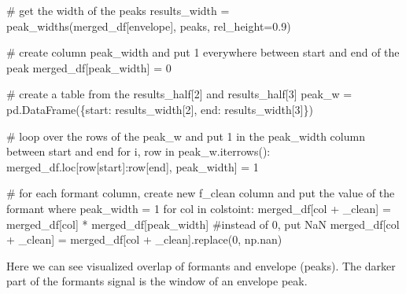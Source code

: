 \documentclass[
  letterpaper,
  DIV=11,
  numbers=noendperiod]{scrreprt}
\newenvironment{Shaded}{\begin{snugshade}}{\end{snugshade}}
\newcommand{\CommentTok}[1]{\textcolor[rgb]{0.37,0.37,0.37}{#1}}
\newcommand{\ControlFlowTok}[1]{\textcolor[rgb]{0.00,0.23,0.31}{#1}}
\newcommand{\DecValTok}[1]{\textcolor[rgb]{0.68,0.00,0.00}{#1}}
\newcommand{\FloatTok}[1]{\textcolor[rgb]{0.68,0.00,0.00}{#1}}
\newcommand{\KeywordTok}[1]{\textcolor[rgb]{0.00,0.23,0.31}{#1}}
\newcommand{\NormalTok}[1]{\textcolor[rgb]{0.00,0.23,0.31}{#1}}
\newcommand{\OperatorTok}[1]{\textcolor[rgb]{0.37,0.37,0.37}{#1}}
\newcommand{\StringTok}[1]{\textcolor[rgb]{0.13,0.47,0.30}{#1}}
\begin{document}
\begin{Shaded}
\begin{Highlighting}[]
\CommentTok{\# get the width of the peaks}
\NormalTok{results\_width }\OperatorTok{=}\NormalTok{ peak\_widths(merged\_df[}\StringTok{\textquotesingle{}envelope\textquotesingle{}}\NormalTok{], peaks, rel\_height}\OperatorTok{=}\FloatTok{0.9}\NormalTok{)}

\CommentTok{\# create column peak\_width and put 1 everywhere between start and end of the peak}
\NormalTok{merged\_df[}\StringTok{\textquotesingle{}peak\_width\textquotesingle{}}\NormalTok{] }\OperatorTok{=} \DecValTok{0}

\CommentTok{\# create a table from the results\_half[2] and results\_half[3]}
\NormalTok{peak\_w }\OperatorTok{=}\NormalTok{ pd.DataFrame(\{}\StringTok{\textquotesingle{}start\textquotesingle{}}\NormalTok{: results\_width[}\DecValTok{2}\NormalTok{], }\StringTok{\textquotesingle{}end\textquotesingle{}}\NormalTok{: results\_width[}\DecValTok{3}\NormalTok{]\})}

\CommentTok{\# loop over the rows of the peak\_w and put 1 in the peak\_width column between start and end}
\ControlFlowTok{for}\NormalTok{ i, row }\KeywordTok{in}\NormalTok{ peak\_w.iterrows():}
\NormalTok{    merged\_df.loc[row[}\StringTok{\textquotesingle{}start\textquotesingle{}}\NormalTok{]:row[}\StringTok{\textquotesingle{}end\textquotesingle{}}\NormalTok{], }\StringTok{\textquotesingle{}peak\_width\textquotesingle{}}\NormalTok{] }\OperatorTok{=} \DecValTok{1}

\CommentTok{\# for each formant column, create new f\_clean column and put the value of the formant where peak\_width = 1}
\ControlFlowTok{for}\NormalTok{ col }\KeywordTok{in}\NormalTok{ colstoint:}
\NormalTok{    merged\_df[col }\OperatorTok{+} \StringTok{\textquotesingle{}\_clean\textquotesingle{}}\NormalTok{] }\OperatorTok{=}\NormalTok{ merged\_df[col] }\OperatorTok{*}\NormalTok{ merged\_df[}\StringTok{\textquotesingle{}peak\_width\textquotesingle{}}\NormalTok{]}
    \CommentTok{\#instead of 0, put NaN}
\NormalTok{    merged\_df[col }\OperatorTok{+} \StringTok{\textquotesingle{}\_clean\textquotesingle{}}\NormalTok{] }\OperatorTok{=}\NormalTok{ merged\_df[col }\OperatorTok{+} \StringTok{\textquotesingle{}\_clean\textquotesingle{}}\NormalTok{].replace(}\DecValTok{0}\NormalTok{, np.nan)}
\end{Highlighting}
\end{Shaded}

Here we can see visualized overlap of formants and envelope (peaks). The
darker part of the formants signal is the window of an envelope peak.
\end{document}

